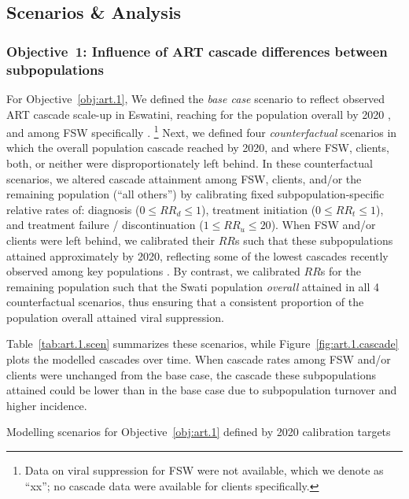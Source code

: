 \subsection{Scenarios \& Analysis}\label{art.meth.obj}
\subsubsection{Objective~1: Influence of ART cascade differences between subpopulations}\label{art.meth.obj.1}
For Objective~\ref{obj:art.1},
We defined the \emph{base case} scenario to reflect
observed ART cascade scale-up in Eswatini, reaching
\cashi for the population overall by 2020 \cite{SHIMS3}, and
\casfsw among FSW specifically \cite{EswIBBS2022}.%
\footnote{Data on viral suppression for FSW were not available, which we denote as ``xx'';
  no cascade data were available for clients specifically.}
Next, we defined four \emph{counterfactual} scenarios in which
the overall population cascade reached \casmd by 2020,
and where FSW, clients, both, or neither were disproportionately left behind.
In these counterfactual scenarios, we altered cascade attainment among
FSW, clients, and/or the remaining population (``all others'') by calibrating
fixed subpopulation-specific relative rates of:
diagnosis ($0 \le {RR}_d \le 1$),
treatment initiation ($0 \le {RR}_t \le 1$), and
treatment failure / discontinuation ($1 \le {RR}_u \le 20$).
When FSW and/or clients were left behind, we calibrated their $RR$s such that
these subpopulations attained approximately \caslo by 2020, reflecting
some of the lowest cascades recently observed among key populations \cite{Hakim2018}.
By contrast, we calibrated $RR$s for the remaining population such that
the Swati population \emph{overall} attained \casmd in all 4 counterfactual scenarios,
thus ensuring that a consistent proportion of the population overall
attained viral suppression.
\par
Table~\ref{tab:art.1.scen} summarizes these scenarios, while
Figure~\ref{fig:art.1.cascade} plots the modelled cascades over time.
When cascade rates among FSW and/or clients were unchanged from the base case,
the cascade these subpopulations attained could be lower than in the base case
due to subpopulation turnover and higher incidence.
\begin{table}
  \centering
  \caption{Modelling scenarios for Objective~\ref{obj:art.1} defined by 2020 calibration targets}
  \label{tab:art.1.scen}
  
\end{table}
